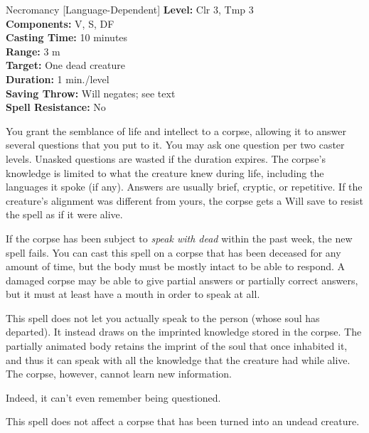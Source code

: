 {Necromancy [Language-Dependent]}
{
	\textbf{Level:}
	Clr 3, Tmp 3\\
	\textbf{Components:}
	V, S, DF\\
	\textbf{Casting Time:}
	10 minutes\\
	\textbf{Range:}
	3 m\\
	\textbf{Target:}
	One dead creature\\
	\textbf{Duration:}
	1 min./level\\
	\textbf{Saving Throw:}
	Will negates; see text\\
	\textbf{Spell Resistance:}
	No\\
}
{
	You grant the semblance of life and intellect to a corpse, allowing it to answer several questions that you put to it. You may ask one question per two caster levels. Unasked questions are wasted if the duration expires. The corpse's knowledge is limited to what the creature knew during life, including the languages it spoke (if any). Answers are usually brief, cryptic, or repetitive. If the creature's alignment was different from yours, the corpse gets a Will save to resist the spell as if it were alive.

	If the corpse has been subject to \emph{speak with dead} within the past week, the new spell fails. You can cast this spell on a corpse that has been deceased for any amount of time, but the body must be mostly intact to be able to respond. A damaged corpse may be able to give partial answers or partially correct answers, but it must at least have a mouth in order to speak at all.

	This spell does not let you actually speak to the person (whose soul has departed). It instead draws on the imprinted knowledge stored in the corpse. The partially animated body retains the imprint of the soul that once inhabited it, and thus it can speak with all the knowledge that the creature had while alive. The corpse, however, cannot learn new information.

	Indeed, it can't even remember being questioned.

	This spell does not affect a corpse that has been turned into an undead creature.

}

